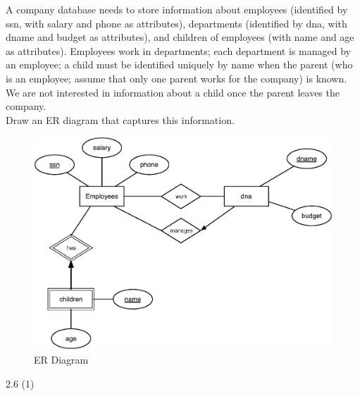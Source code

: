 \begin{problem}{2.4}

  A company database needs to store information about employees (identified by ssn, with salary and phone as
  attributes), departments (identified by dna, with dname and budget as attributes), and children of employees (with
  name and age as attributes). Employees work in departments; each department is managed by an employee; a child must be
  identified uniquely by name when the parent (who is an employee; assume that only one parent works for the company) is
  known. We are not interested in information about a child once the parent leaves the company. \\

  \noindent Draw an ER diagram that captures this information.

  \begin{solution}
    \begin{figure}[H]
      \centering
      \caption{ER Diagram}
      \includegraphics[scale=.5]{2_4.eps}
    \end{figure}
  \end{solution}
\end{problem}
\begin{problem}{2.6 (1)}
  \begin{solution}
  \end{solution}
\end{problem}
\begin{problem}{2.8}
  \begin{solution}
  \end{solution}
\end{problem}



